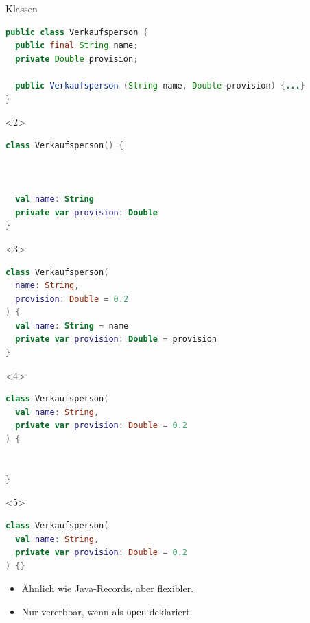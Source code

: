 \documentclass{beamer}
\begin{document}
\begin{frame}[fragile]{Klassen}
  \vspace{-0.25cm}
  \begin{lstlisting}[language=Java, title=Java, xleftmargin=1em]
public class Verkaufsperson {
  public final String name;
  private Double provision;

  public Verkaufsperson (String name, Double provision) {...}
}
  \end{lstlisting}
  \vspace{-0.25cm}
  \begin{onlyenv}<2>
    \begin{lstlisting}[language=Kotlin, title=Kotlin, xleftmargin=1em]
class Verkaufsperson() {



  val name: String
  private var provision: Double
}
    \end{lstlisting} 
  \end{onlyenv}
  \begin{onlyenv}<3>
    \begin{lstlisting}[language=Kotlin, title=Kotlin, xleftmargin=1em]
class Verkaufsperson(
  name: String,
  provision: Double = 0.2
) {
  val name: String = name
  private var provision: Double = provision
}
    \end{lstlisting} 
  \end{onlyenv}
  \begin{onlyenv}<4>
    \begin{lstlisting}[language=Kotlin, title=Kotlin, xleftmargin=1em]
class Verkaufsperson(
  val name: String,
  private var provision: Double = 0.2
) {


}
    \end{lstlisting} 
  \end{onlyenv}
  \begin{onlyenv}<5>
    \begin{lstlisting}[language=Kotlin, title=Kotlin, xleftmargin=1em]
class Verkaufsperson(
  val name: String,
  private var provision: Double = 0.2
) {}
    \end{lstlisting} 
    \begin{itemize}
      \item Ähnlich wie Java-Records, aber flexibler.
      \item Nur vererbbar, wenn als \texttt{open} deklariert.
    \end{itemize}
  \end{onlyenv}
\end{frame}
\end{document}
